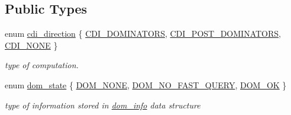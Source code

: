 \subsection*{Public Types}
\begin{DoxyCompactItemize}
\item 
enum \hyperlink{classdominance_a983b27e93af6a5d375c01d81c2c30c40}{cdi\+\_\+direction} \{ \hyperlink{classdominance_a983b27e93af6a5d375c01d81c2c30c40a9bb7883e70e88042ea0bc46c671ba304}{C\+D\+I\+\_\+\+D\+O\+M\+I\+N\+A\+T\+O\+RS}, 
\hyperlink{classdominance_a983b27e93af6a5d375c01d81c2c30c40a2caf93bbe04a5500dcf61e93cb82dbb8}{C\+D\+I\+\_\+\+P\+O\+S\+T\+\_\+\+D\+O\+M\+I\+N\+A\+T\+O\+RS}, 
\hyperlink{classdominance_a983b27e93af6a5d375c01d81c2c30c40a10dfe4e2a2ac59d8d75f1e18ed0e85e6}{C\+D\+I\+\_\+\+N\+O\+NE}
 \}\begin{DoxyCompactList}\small\item\em type of computation. \end{DoxyCompactList}
\item 
enum \hyperlink{classdominance_a0c204e06a7b2ea3dc3594722523ab47e}{dom\+\_\+state} \{ \hyperlink{classdominance_a0c204e06a7b2ea3dc3594722523ab47ea584a12c41138df6815c9a37a9e99f727}{D\+O\+M\+\_\+\+N\+O\+NE}, 
\hyperlink{classdominance_a0c204e06a7b2ea3dc3594722523ab47ea3b4ea5fe90361f3c198157873762a2dd}{D\+O\+M\+\_\+\+N\+O\+\_\+\+F\+A\+S\+T\+\_\+\+Q\+U\+E\+RY}, 
\hyperlink{classdominance_a0c204e06a7b2ea3dc3594722523ab47ea0e43c6c013f3f633a0c56a6ec228fbf3}{D\+O\+M\+\_\+\+OK}
 \}\begin{DoxyCompactList}\small\item\em type of information stored in \hyperlink{classdom__info}{dom\+\_\+info} data structure \end{DoxyCompactList}
\end{DoxyCompactItemize}

